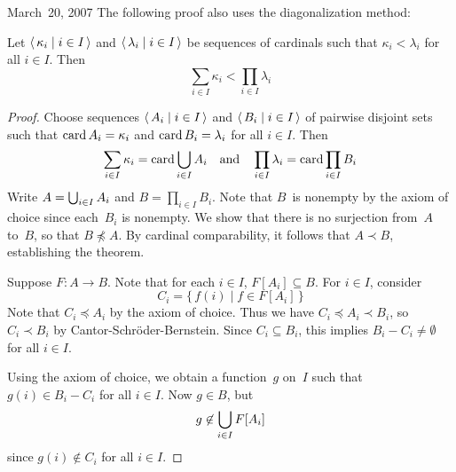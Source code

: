 \begin{lecture}{March~20, 2007}
The following proof also uses the diagonalization method:
\begin{thm}[K\"onig]
Let \(\langle\,{\kappa_i}\mid{i\in I}\,\rangle\) and \(\langle\,{\lambda_i}\mid{i\in I}\,\rangle\) be sequences of cardinals such that \(\kappa_i<\lambda_i\) for all \(i\in I\). Then
\[\sum_{i\in I}\kappa_i<\prod_{i\in I}\lambda_i\]
\end{thm}
\begin{proof}
Choose sequences \(\langle\,{A_i}\mid{i\in I}\,\rangle\) and \(\langle\,{B_i}\mid{i\in I}\,\rangle\) of pairwise disjoint sets such that \(\operatorname{card} A_i=\kappa_i\) and \(\operatorname{card} B_i=\lambda_i\) for all \(i\in I\). Then
\[\sum_{i\in I}\kappa_i=\operatorname{card}\bigcup_{i\in I}A_i\quad\text{and}\quad\prod_{i\in I}\lambda_i=\operatorname{card}\prod_{i\in I}B_i\]
Write \(A=\bigcup_{i\in I}A_i\) and \(B=\prod_{i\in I}B_i\). Note that \(B\)~is nonempty by the axiom of choice since each~\(B_i\) is nonempty. We show that there is no surjection from~\(A\) to~\(B\), so that \(B\not\preceq A\). By cardinal comparability, it follows that \(A\prec B\), establishing the theorem.

Suppose \(F:A\to B\). Note that for each \(i\in I\), \(F[A_i]\subseteq B\). For \(i\in I\), consider
\[C_i=\{\,f(i)\mid f\in F[A_i]\,\}\]
Note that \(C_i\preceq A_i\) by the axiom of choice. Thus we have \(C_i\preceq A_i\prec B_i\), so \(C_i\prec B_i\) by Cantor-Schr\"oder-Bernstein. Since \(C_i\subseteq B_i\), this implies \(B_i-C_i\ne\emptyset\) for all \(i\in I\).

Using the axiom of choice, we obtain a function~\(g\) on~\(I\) such that \(g(i)\in B_i-C_i\) for all \(i\in I\). Now \(g\in B\), but
\[g\not\in\bigcup_{i\in I} F[A_i]\]
since \(g(i)\not\in C_i\) for all \(i\in I\).
\end{proof}


\end{lecture}

